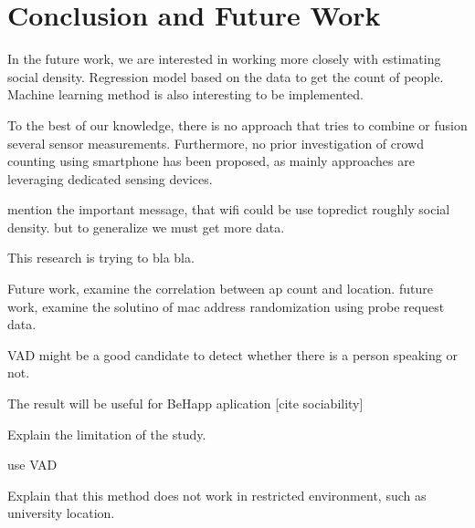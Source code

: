 \chapter{Conclusion and Future Work}
\label{ch:conclusion-future-work} %
In the future work, we are interested in working more closely with estimating social density. Regression model based on the data to get the count of people. Machine learning method is also interesting to be implemented.

To the best of our knowledge, there is no approach that tries to combine or fusion several sensor measurements. Furthermore, no prior investigation of crowd counting using smartphone has been proposed, as mainly approaches are leveraging dedicated sensing devices.

mention the important message, that wifi could be use topredict roughly social density. but to generalize we must get more data.

This research is trying to bla bla.

Future work, examine the correlation between ap count and location.
future work, examine the solutino of mac address randomization using probe request data.

VAD might be a good candidate to detect whether there is a person speaking or not.

The result will be useful for BeHapp aplication [cite sociability]

Explain the limitation of the study.

use VAD

Explain that this method does not work in restricted environment, such as university location.

